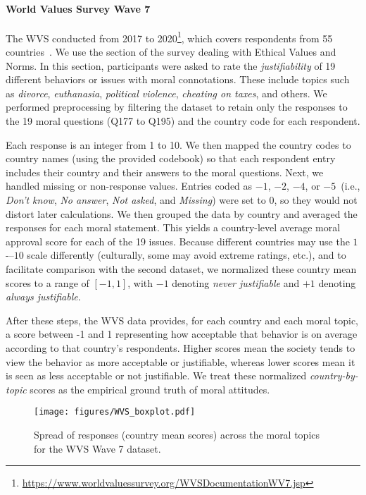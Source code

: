 \documentclass[11pt]{article}
\begin{document}
\paragraph{World Values Survey Wave 7} The WVS conducted from 2017 to 2020\footnote{\url{https://www.worldvaluessurvey.org/WVSDocumentationWV7.jsp}}, which covers respondents from 55 countries~\citep{Inglehart2014, Haerpfer2022}. We use the section of the survey dealing with Ethical Values and Norms. In this section, participants were asked to rate the \emph{justifiability} of 19 different behaviors or issues with moral connotations. These include topics such as \emph{divorce}, \emph{euthanasia}, \emph{political violence}, \emph{cheating on taxes}, and others. We performed preprocessing by filtering the dataset to retain only the responses to the 19 moral questions (Q177 to Q195) and the country code for each respondent. 


Each response is an integer from 1 to 10. We then mapped the country codes to country names (using the provided codebook) so that each respondent entry includes their country and their answers to the moral questions. Next, we handled missing or non-response values. Entries coded as \(-1\), \(-2\), \(-4\), or \(-5\)~(i.e., \emph{Don’t know}, \emph{No answer}, \emph{Not asked}, and \emph{Missing}) were set to \(0\), so they would not distort later calculations. We then grouped the data by country and averaged the responses for each moral statement. This yields a country-level average moral approval score for each of the 19 issues. Because different countries may use the \(1\)-–\(10\) scale differently (culturally, some may avoid extreme ratings, etc.), and to facilitate comparison with the second dataset, we normalized these country mean scores to a range of \([-1, 1]\), with \(-1\) denoting \emph{never justifiable} and \(+1\) denoting \emph{always justifiable}. 

After these steps, the WVS data provides, for each country and each moral topic, a score between -1 and 1 representing how acceptable that behavior is on average according to that country’s respondents. Higher scores mean the society tends to view the behavior as more acceptable or justifiable, whereas lower scores mean it is seen as less acceptable or not justifiable. We treat these normalized \emph{country-by-topic} scores as the empirical ground truth of moral attitudes.

\begin{figure}[H]
        \centering
        \texttt{[image: figures/WVS\_boxplot.pdf]}
        \vspace{-8pt}
        \caption{\small Spread of responses (country mean scores) across the moral topics for the WVS Wave 7 dataset. }
        \label{fig:wvs_figures_2}
    \end{figure}
\vspace{-10pt}
\end{document}
